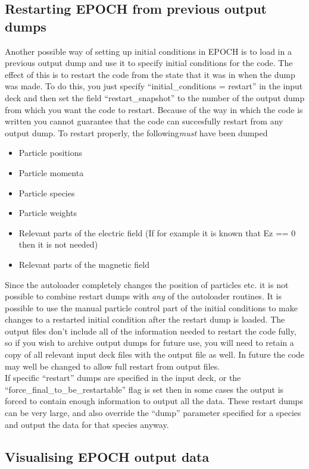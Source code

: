 \documentclass[12pt]{article}
\newcommand{\nEPOCH}{{\color{warwickdark}\fontfamily{phv}\selectfont EPOCH}}
\newcommand{\EPOCH}{{\nEPOCH} }
\begin{document}
\subsection{Restarting \EPOCH from previous output dumps}
Another possible way of setting up initial conditions in \EPOCH is to load in
a previous output dump and use it to specify initial conditions for the
code. The effect of this is to restart the code from the state that it was in
when the dump was made. To do this, you just specify ``initial\_conditions =
restart'' in the input deck and then set the field ``restart\_snapshot'' to
the number of the output dump from which you want the code to restart. Because
of the way in which the code is written you cannot guarantee that the code can
succesfully restart from any output dump. To restart properly, the
following{\it must} have been dumped
\begin{itemize}
\item Particle positions
\item Particle momenta
\item Particle species
\item Particle weights
\item Relevant parts of the electric field (If for example it is known that Ez
  == 0 then it is not needed)
\item Relevant parts of the magnetic field
\end{itemize}
Since the autoloader completely changes the position of particles etc. it is
not possible to combine restart dumps with {\it any} of the autoloader
routines. It is possible to use the manual particle control part of the
initial conditions to make changes to a restarted initial condition after the
restart dump is loaded. The output files don't include all of the information
needed to restart the code fully, so if you wish to archive output dumps for
future use, you will need to retain a copy of all relevant input deck files
with the output file as well. In future the code may well be changed to allow
full restart from output files.\\

If specific ``restart'' dumps are specified in the input deck, or the
``force\_final\_to\_be\_restartable'' flag is set then in some cases the
output is forced to contain enough information to output all the data. These
restart dumps can be very large, and also override the ``dump'' parameter
specified for a species and output the data for that species anyway.

\subsection{Visualising \EPOCH output data}
\end{document}
